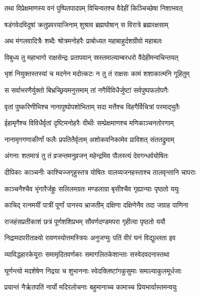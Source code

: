 
\twolineshloka
{तथा विप्रेक्षमाणस्य वनं पुष्पितपादपम्}
{विचिन्वतश्च वैदेहीं किञ्चिच्छेषा निशाभवत्} %

\twolineshloka
{षडंगवेदविदुषां क्रतुप्रवरयाजिनाम्}
{शुश्राव ब्रह्मघोषान् स विरात्रे ब्रह्मरक्षसाम्} %

\twolineshloka
{अथ मंगलवादित्रैः शब्दैः श्रोत्रमनोहरैः}
{प्राबोध्यत महाबाहुर्दशग्रीवो महाबलः} %

\twolineshloka
{विबुध्य तु महाभागो राक्षसेन्द्रः प्रतापवान्}
{स्रस्तमाल्याम्बरधरो वैदेहीमन्वचिन्तयत्} %

\twolineshloka
{भृशं नियुक्तस्तस्यां च मदनेन मदोत्कटः}
{न तु तं राक्षसः कामं शशाकात्मनि गूहितुम्} %

\twolineshloka
{स सर्वाभरणैर्युक्तो बिभ्रच्छ्रियमनुत्तमाम्}
{तां नगैर्विविधैर्जुष्टां सर्वपुष्पफलोपगैः} %

\twolineshloka
{वृतां पुष्करिणीभिश्च नानापुष्पोपशोभिताम्}
{सदा मत्तैश्च विहगैर्विचित्रां परमाद्भुतैः} %

\twolineshloka
{ईहामृगैश्च विविधैर्वृतां दृष्टिमनोहरैः}
{वीथीः सम्प्रेक्षमाणश्च मणिकाञ्चनतोरणाम्} %

\twolineshloka
{नानामृगगणाकीर्णां फलैः प्रपतितैर्वृताम्}
{अशोकवनिकामेव प्राविशत् संततद्रुमाम्} %

\twolineshloka
{अंगनाः शतमात्रं तु तं व्रजन्तमनुव्रजन्}
{महेन्द्रमिव पौलस्त्यं देवगन्धर्वयोषितः} %

\twolineshloka
{दीपिकाः काञ्चनीः काश्चिज्जगृहुस्तत्र योषितः}
{वालव्यजनहस्ताश्च तालवृन्तानि चापराः} %

\twolineshloka
{काञ्चनैश्चैव भृंगारैर्जह्रुः सलिलमग्रतः}
{मण्डलाग्रा बृसीश्चैव गृह्यान्याः पृष्ठतो ययुः} %

\twolineshloka
{काचिद् रत्नमयीं पात्रीं पूर्णां पानस्य भ्राजतीम्}
{दक्षिणा दक्षिणेनैव तदा जग्राह पाणिना} %

\twolineshloka
{राजहंसप्रतीकाशं छत्रं पूर्णशशिप्रभम्}
{सौवर्णदण्डमपरा गृहीत्वा पृष्ठतो ययौ} %

\twolineshloka
{निद्रामदपरीताक्ष्यो रावणस्योत्तमस्त्रियः}
{अनुजग्मुः पतिं वीरं घनं विद्युल्लता इव} %

\twolineshloka
{व्याविद्धहारकेयूराः समामृदितवर्णकाः}
{समागलितकेशान्ताः सस्वेदवदनास्तथा} %

\twolineshloka
{घूर्णन्त्यो मदशेषेण निद्रया च शुभाननाः}
{स्वेदक्लिष्टांगकुसुमाः समाल्याकुलमूर्धजाः} %

\twolineshloka
{प्रयान्तं नैर्ऋतपतिं नार्यो मदिरलोचनाः}
{बहुमानाच्च कामाच्च प्रियभार्यास्तमन्वयुः} %


